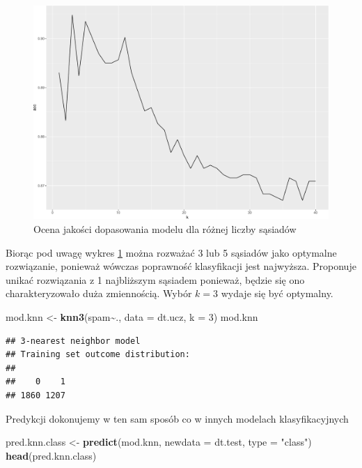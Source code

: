 \documentclass[
]{book}
\newenvironment{Shaded}{\begin{snugshade}}{\end{snugshade}}
\newcommand{\AttributeTok}[1]{\textcolor[rgb]{0.13,0.29,0.53}{#1}}
\newcommand{\DecValTok}[1]{\textcolor[rgb]{0.00,0.00,0.81}{#1}}
\newcommand{\FunctionTok}[1]{\textcolor[rgb]{0.13,0.29,0.53}{\textbf{#1}}}
\newcommand{\NormalTok}[1]{#1}
\newcommand{\OtherTok}[1]{\textcolor[rgb]{0.56,0.35,0.01}{#1}}
\newcommand{\SpecialCharTok}[1]{\textcolor[rgb]{0.81,0.36,0.00}{\textbf{#1}}}
\newcommand{\StringTok}[1]{\textcolor[rgb]{0.31,0.60,0.02}{#1}}
\theoremstyle{plain}
\theoremstyle{definition}
\theoremstyle{definition}
\theoremstyle{definition}
\theoremstyle{definition}
\theoremstyle{definition}
\theoremstyle{remark}
\begin{document}
\begin{figure}

{\centering \includegraphics{EksploracjaDanych_files/figure-latex/knnrys-1} 

}

\caption{Ocena jakości dopasowania modelu dla różnej liczby sąsiadów}\label{fig:knnrys}
\end{figure}

Biorąc pod uwagę wykres \ref{fig:knnrys} można rozważać 3 lub 5 sąsiadów jako optymalne rozwiązanie, ponieważ wówczas poprawność klasyfikacji jest najwyższa. Proponuje unikać rozwiązania z 1 najbliższym sąsiadem ponieważ, będzie się ono charakteryzowało duża zmiennością. Wybór \(k=3\) wydaje się być optymalny.

\begin{Shaded}
\begin{Highlighting}[]
\NormalTok{mod.knn }\OtherTok{\textless{}{-}} \FunctionTok{knn3}\NormalTok{(spam}\SpecialCharTok{\textasciitilde{}}\NormalTok{., }\AttributeTok{data =}\NormalTok{ dt.ucz,}
                \AttributeTok{k =} \DecValTok{3}\NormalTok{)}
\NormalTok{mod.knn}
\end{Highlighting}
\end{Shaded}

\begin{verbatim}
## 3-nearest neighbor model
## Training set outcome distribution:
## 
##    0    1 
## 1860 1207
\end{verbatim}

Predykcji dokonujemy w ten sam sposób co w innych modelach klasyfikacyjnych

\begin{Shaded}
\begin{Highlighting}[]
\NormalTok{pred.knn.class }\OtherTok{\textless{}{-}} \FunctionTok{predict}\NormalTok{(mod.knn, }\AttributeTok{newdata =}\NormalTok{ dt.test, }\AttributeTok{type =} \StringTok{"class"}\NormalTok{)}
\FunctionTok{head}\NormalTok{(pred.knn.class)}
\end{Highlighting}
\end{Shaded}
\end{document}
